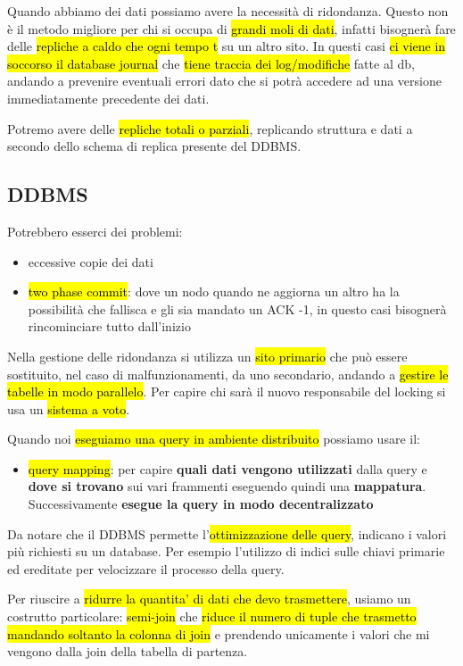 Quando abbiamo dei dati possiamo avere la necessità di ridondanza. Questo non è il metodo migliore per chi si occupa di \hl{grandi moli di dati}, infatti bisognerà fare delle \hl{repliche a caldo che ogni tempo t} su un altro sito. In questi casi \hl{ci viene in soccorso il database journal} che \hl{tiene traccia dei log/modifiche} fatte al db, andando a prevenire eventuali errori dato che si potrà accedere ad una versione immediatamente precedente dei dati.

Potremo avere delle \hl{repliche totali o parziali}, replicando struttura e dati a secondo dello schema di replica presente del DDBMS.


\subsection{DDBMS}

Potrebbero esserci dei problemi:

\begin{itemize}
    \item eccessive copie dei dati
    \item \hl{two phase commit}: dove un nodo quando ne aggiorna un altro ha la possibilità che fallisca e gli sia mandato un ACK -1, in questo casi bisognerà rincominciare tutto dall'inizio
\end{itemize}

Nella gestione delle ridondanza si utilizza un \hl{sito primario} che può essere sostituito, nel caso di malfunzionamenti, da uno secondario, andando a \hl{gestire le tabelle in modo parallelo}. Per capire chi sarà il nuovo responsabile del locking si usa un \hl{sistema a voto}. 

Quando noi \hl{eseguiamo una query in ambiente distribuito} possiamo usare il:

\begin{itemize}
    \item[] \hl{query mapping}: per capire \textbf{quali dati vengono utilizzati} dalla query e \textbf{dove si trovano} sui vari frammenti eseguendo quindi una \textbf{mappatura}. Successivamente \textbf{esegue la query in modo decentralizzato}
\end{itemize}

Da notare che il DDBMS permette l’\hl{ottimizzazione delle query}, indicano i valori più richiesti su un database. Per esempio l'utilizzo di indici sulle chiavi primarie ed ereditate per velocizzare il processo della query.


Per riuscire a \hl{ridurre la quantita' di dati che devo trasmettere}, usiamo un costrutto particolare: \hl{semi-join} che \hl{riduce il numero di tuple che trasmetto mandando soltanto la colonna di join} e prendendo unicamente i valori che mi vengono dalla join della tabella di partenza. 

